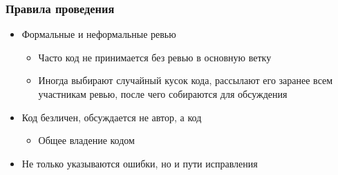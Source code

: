 \documentclass[xetex,mathserif,serif]{beamer}
\begin{document}
	\begin{frame}
		\frametitle{Правила проведения}
		\begin{itemize}
			\item Формальные и неформальные ревью
			\begin{itemize}
				\item Часто код не принимается без ревью в основную ветку
				\item Иногда выбирают случайный кусок кода, рассылают его заранее всем участникам ревью, после чего собираются для обсуждения
			\end{itemize}
			\item Код безличен, обсуждается не автор, а код
			\begin{itemize}
				\item Общее владение кодом
			\end{itemize}
			\item Не только указываются ошибки, но и пути исправления
		\end{itemize}
	\end{frame}
\end{document}
